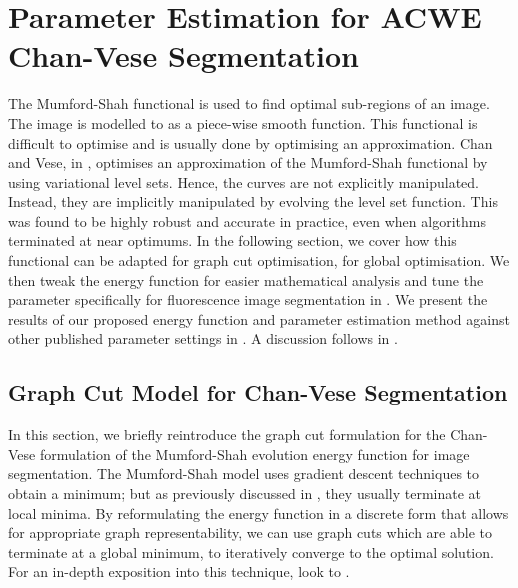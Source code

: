 
\chapter{Parameter Estimation for ACWE Chan-Vese Segmentation} %

\label{chap:Chapter5} %


The Mumford-Shah functional \citep{Mumford1989} is used to find optimal sub-regions of an image. The image is modelled to as a piece-wise smooth function. This functional is difficult to optimise and is usually done by optimising an approximation. Chan and Vese, in \citep{Chan2001}, optimises an approximation of the Mumford-Shah functional by using variational level sets. Hence, the curves are not explicitly manipulated. Instead, they are implicitly manipulated by evolving the level set function. This was found to be highly robust and accurate in practice, even when algorithms terminated at near optimums. In the following section, we cover how this functional can be adapted for graph cut optimisation, for global optimisation. We then tweak the energy function for easier mathematical analysis and tune the parameter specifically for fluorescence image segmentation in . We present the results of our proposed energy function and parameter estimation method against other published parameter settings in . A discussion follows in .

\section{Graph Cut Model for Chan-Vese Segmentation}
\label{sec:chanveseGC}

In this section, we briefly reintroduce the graph cut formulation for the Chan-Vese formulation of the Mumford-Shah evolution energy function for image segmentation. The Mumford-Shah model uses gradient descent techniques to obtain a minimum; but as previously discussed in , they usually terminate at local minima. By reformulating the energy function in a discrete form that allows for appropriate graph representability, we can use graph cuts which are able to terminate at a global minimum, to iteratively converge to the optimal solution. For an in-depth exposition into this technique, look to \citep{Mumford1989,Chan2001,ElZehiry2007}.

